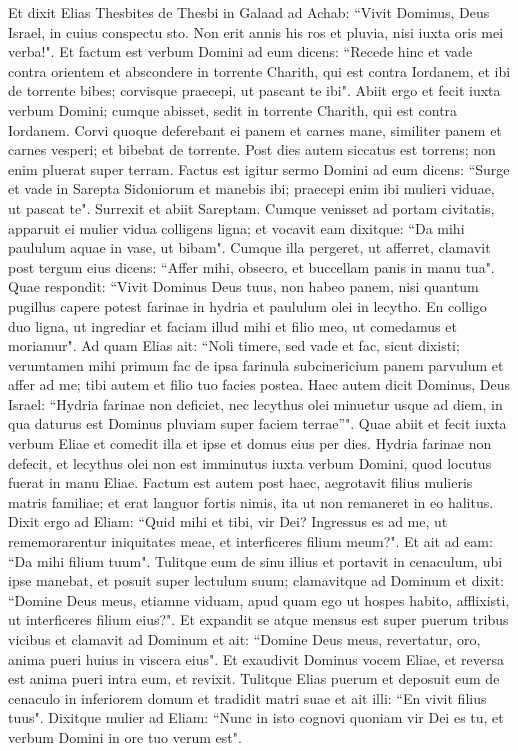 \begin{biblechapter}  
\verse Et dixit Elias Thesbites de Thesbi in Galaad ad Achab: “Vivit Dominus, Deus Israel, in cuius conspectu sto. Non erit annis his ros et pluvia, nisi iuxta oris mei verba!". 
\verse Et factum est verbum Domini ad eum dicens: 
\verse “Recede hinc et vade contra orientem et abscondere in torrente Charith, qui est contra Iordanem, 
\verse et ibi de torrente bibes; corvisque praecepi, ut pascant te ibi". 
\verse Abiit ergo et fecit iuxta verbum Domini; cumque abisset, sedit in torrente Charith, qui est contra Iordanem. 
\verse Corvi quoque deferebant ei panem et carnes mane, similiter panem et carnes vesperi; et bibebat de torrente. 
\verse Post dies autem siccatus est torrens; non enim pluerat super terram. 
\verse Factus est igitur sermo Domini ad eum dicens: 
\verse “Surge et vade in Sarepta Sidoniorum et manebis ibi; praecepi enim ibi mulieri viduae, ut pascat te". 
\verse Surrexit et abiit Sareptam. Cumque venisset ad portam civitatis, apparuit ei mulier vidua colligens ligna; et vocavit eam dixitque: “Da mihi paululum aquae in vase, ut bibam". 
\verse Cumque illa pergeret, ut afferret, clamavit post tergum eius dicens: “Affer mihi, obsecro, et buccellam panis in manu tua". 
\verse Quae respondit: “Vivit Dominus Deus tuus, non habeo panem, nisi quantum pugillus capere potest farinae in hydria et paululum olei in lecytho. En colligo duo ligna, ut ingrediar et faciam illud mihi et filio meo, ut comedamus et moriamur". 
\verse Ad quam Elias ait: “Noli timere, sed vade et fac, sicut dixisti; verumtamen mihi primum fac de ipsa farinula subcinericium panem parvulum et affer ad me; tibi autem et filio tuo facies postea. 
\verse Haec autem dicit Dominus, Deus Israel: “Hydria farinae non deficiet, nec lecythus olei minuetur usque ad diem, in qua daturus est Dominus pluviam super faciem terrae”". 
\verse Quae abiit et fecit iuxta verbum Eliae et comedit illa et ipse et domus eius per dies. 
\verse Hydria farinae non defecit, et lecythus olei non est imminutus iuxta verbum Domini, quod locutus fuerat in manu Eliae. 
\verse Factum est autem post haec, aegrotavit filius mulieris matris familiae; et erat languor fortis nimis, ita ut non remaneret in eo halitus. 
\verse Dixit ergo ad Eliam: “Quid mihi et tibi, vir Dei? Ingressus es ad me, ut rememorarentur iniquitates meae, et interficeres filium meum?". 
\verse Et ait ad eam: “Da mihi filium tuum". Tulitque eum de sinu illius et portavit in cenaculum, ubi ipse manebat, et posuit super lectulum suum; 
\verse clamavitque ad Dominum et dixit: “Domine Deus meus, etiamne viduam, apud quam ego ut hospes habito, afflixisti, ut interficeres filium eius?". 
\verse Et expandit se atque mensus est super puerum tribus vicibus et clamavit ad Dominum et ait: “Domine Deus meus, revertatur, oro, anima pueri huius in viscera eius". 
\verse Et exaudivit Dominus vocem Eliae, et reversa est anima pueri intra eum, et revixit. 
\verse Tulitque Elias puerum et deposuit eum de cenaculo in inferiorem domum et tradidit matri suae et ait illi: “En vivit filius tuus". 
\verse Dixitque mulier ad Eliam: “Nunc in isto cognovi quoniam vir Dei es tu, et verbum Domini in ore tuo verum est". 
\end{biblechapter}

